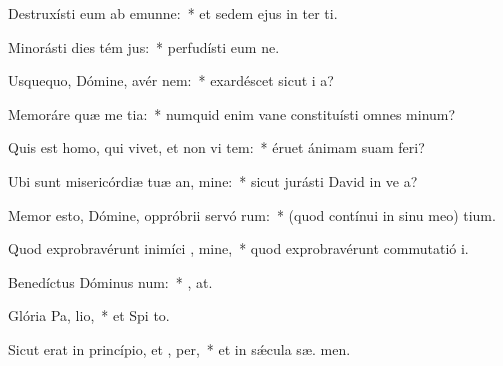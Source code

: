 \item Destruxísti eum ab emunne:~* et sedem ejus in ter ti.
\item Minorásti dies tém jus:~* perfudísti eum ne.
\item Usquequo, Dómine, avér  nem:~* exardéscet sicut i  a?
\item Memoráre quæ me tia:~* numquid enim vane constituísti omnes  minum?
\item Quis est homo, qui vivet, et non vi tem:~* éruet ánimam suam   feri?
\item Ubi sunt misericórdiæ tuæ an, mine:~* sicut jurásti David in ve a?
\item Memor esto, Dómine, oppróbrii servó rum:~* (quod contínui in sinu meo)  tium.
\item Quod exprobravérunt inimíci , mine,~* quod exprobravérunt commutatió  i.
\item Benedíctus Dóminus  num:~* , at.
\item Glória Pa,  lio,~* et Spi to.
\item Sicut erat in princípio, et ,  per,~* et in sǽcula sæ. men.
